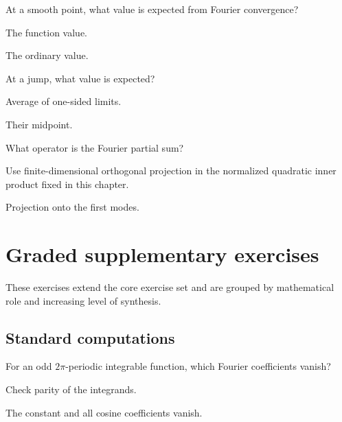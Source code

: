 \begin{exercise}\label{exr:ii14-06}
At a smooth point, what value is expected from Fourier convergence?
\end{exercise}
\begin{hint}
The function value.
\end{hint}
\begin{solution}
The ordinary value.
\end{solution}

\begin{exercise}\label{exr:ii14-07}
At a jump, what value is expected?
\end{exercise}
\begin{hint}
Average of one-sided limits.
\end{hint}
\begin{solution}
Their midpoint.
\end{solution}

\begin{exercise}\label{exr:ii14-08}
What operator is the Fourier partial sum?
\end{exercise}
\begin{hint}
Use finite-dimensional orthogonal projection in the normalized quadratic inner product fixed in this chapter.
\end{hint}
\begin{solution}
Projection onto the first modes.
\end{solution}


\section{Graded supplementary exercises}
These exercises extend the core exercise set and are grouped by mathematical role and increasing level of synthesis.

\subsection*{Standard computations}

\begin{exercise}\label{exr:ii14-expand-01}
For an odd \(2\pi\)-periodic integrable function, which Fourier coefficients vanish?
\end{exercise}
\begin{hint}
Check parity of the integrands.
\end{hint}
\begin{solution}
The constant and all cosine coefficients vanish.
\end{solution}

